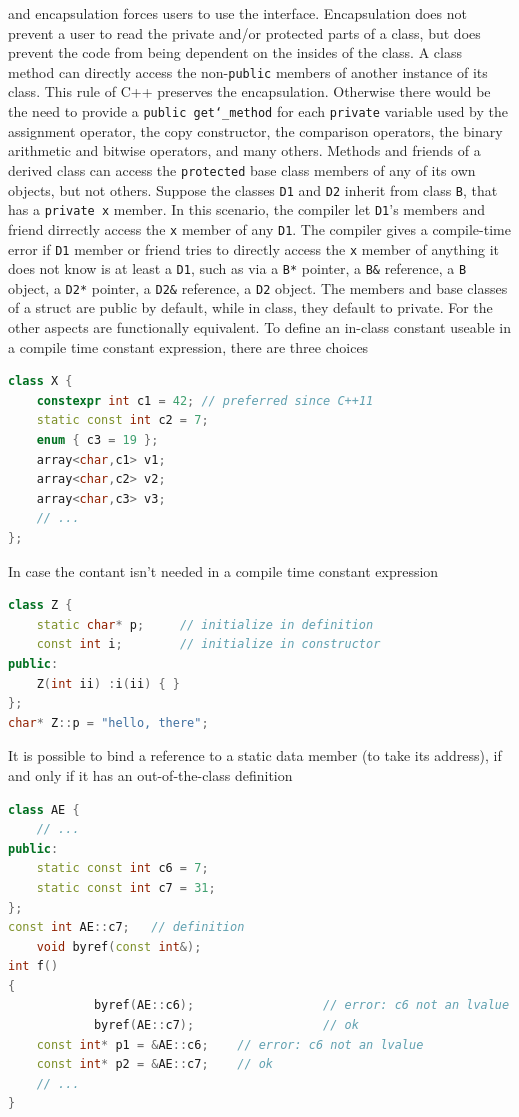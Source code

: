 and encapsulation forces users to use the interface.
\newline
Encapsulation does not prevent a user to read the private and/or protected 
parts of a class, but does prevent the code from being dependent on the 
insides of the class.
\newline
A class method can directly access the non-\texttt{public} members of 
another instance of its class. This rule of C++ preserves the encapsulation. 
Otherwise there would be the need to provide a \texttt{public get\char`_method} 
for each \texttt{private} variable used by the assignment operator, 
the copy constructor, the comparison operators, the binary arithmetic 
and bitwise operators, and many others.
\newline
Methods and friends of a derived class can access the \texttt{protected} 
base class members of any of its own objects, but not others. Suppose 
the classes \texttt{D1} and \texttt{D2} inherit from class \texttt{B}, 
that has a \texttt{private x} member. In this scenario, the compiler 
let \texttt{D1}'s members and friend dirrectly access the \texttt{x} 
member of any \texttt{D1}. The compiler gives a compile-time error 
if \texttt{D1} member or friend tries to directly access the \texttt{x} 
member of anything it does not know is at least a \texttt{D1}, such as 
via a \texttt{B*} pointer, a \texttt{B\&} reference, a \texttt{B} object, 
a \texttt{D2*} pointer, a \texttt{D2\&} reference, a \texttt{D2} object.
\newline
The members and base classes of a struct are public by default, while in 
class, they default to private. For the other aspects are functionally 
equivalent.
\newline
To define an in-class constant useable in a compile time constant expression, 
there are three choices
\begin{lstlisting}[language=C++]
class X {
    constexpr int c1 = 42; // preferred since C++11
    static const int c2 = 7;
    enum { c3 = 19 };
    array<char,c1> v1;
    array<char,c2> v2;
    array<char,c3> v3;
    // ...
};    
\end{lstlisting}
In case the contant isn't needed in a compile time constant expression
\begin{lstlisting}[language=C++]
class Z {
    static char* p;     // initialize in definition
    const int i;        // initialize in constructor
public:
    Z(int ii) :i(ii) { }
};
char* Z::p = "hello, there";    
\end{lstlisting}
It is possible to bind a reference to a static data member (to take its 
address), if and only if it has an out-of-the-class definition
\begin{lstlisting}[language=C++]
class AE {
    // ...
public:
    static const int c6 = 7;
    static const int c7 = 31;
};
const int AE::c7;   // definition
    void byref(const int&);
int f()
{
            byref(AE::c6);                  // error: c6 not an lvalue
            byref(AE::c7);                  // ok
    const int* p1 = &AE::c6;    // error: c6 not an lvalue
    const int* p2 = &AE::c7;    // ok
    // ...
}
\end{lstlisting}

